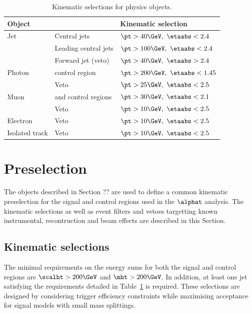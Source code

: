 \begin{table}[h!]
  \caption{Kinematic selections for physics objects.\label{tab:kine-sel}}
  \centering
  \footnotesize
  \begin{tabular}{ lll }
    \hline
    \hline
    Object 	& 	&Kinematic selection \\
    \hline
    \hline
    Jet  		&Central jets& $\pt > 40 \GeV,\ \etaabs < 2.4$		    \\
			&Leading central jets&	$\pt > 100 \GeV,\ \etaabs < 2.4$	\\	    	    
			&Forward jet (veto) &$\pt > 40 \GeV,\ \etaabs > 2.4$	\\	    
    Photon  		&\gj control region& $\pt > 200 \GeV,\ \etaabs < 1.45$	\\	    
			&Veto& $\pt > 25 \GeV,\ \etaabs < 2.5$		    \\
    Muon  		&\mj and \mmj control regions& $\pt > 30 \GeV,\ \etaabs < 2.1$	\\	    
			&Veto& $\pt > 10 \GeV,\ \etaabs < 2.5$		    \\
    Electron  		&Veto& $\pt > 10 \GeV,\ \etaabs < 2.5$		    \\
    Isolated track  	&Veto& $\pt > 10 \GeV,\ \etaabs < 2.5$		    \\
		
    
    \hline
    \hline
  \end{tabular}
  \end{table}

\section{Preselection}
The objects described in Section ?? are used to define a common kinematic 
preselection for the signal and control regions used in the $\alphat$ analysis. 
The kinematic selections as well as event filters and vetoes targetting
known instrumental, recontruction and beam effects are described in this Section.

\subsection{Kinematic selections}
The minimal requirements on the energy sums for both the signal and control regions are
$\scalht > 200\GeV$ and $\mht > 200\GeV$. In addition, at least one jet satisfying the 
requirements detailed in Table~\ref{tab:kine-sel} is required. These selections are 
designed by considering trigger efficiency constraints while maximising acceptance for
signal models with small mass splittings.
